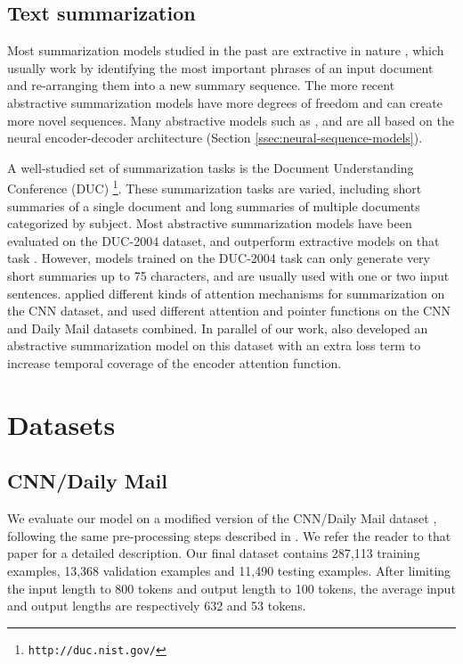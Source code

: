 \subsection{Text summarization}

Most summarization models studied in the past are extractive in nature \citep{dorr2003,nallapati2017,durrett2016learning}, which usually work by identifying the most important phrases of an input document and re-arranging them into a new summary sequence. The more recent abstractive summarization models have more degrees of freedom and can create more novel sequences. Many abstractive models such as \citet{rush2015}, \citet{chopra2016} and \citet{nallapati2016} are all based on the neural encoder-decoder architecture (Section \ref{ssec:neural-sequence-models}).

A well-studied set of summarization tasks is the Document Understanding Conference (DUC) \footnote{\tt http://duc.nist.gov/}. These summarization tasks are varied, including short summaries of a single document and long summaries of multiple documents categorized by subject. Most abstractive summarization models have been evaluated on the DUC-2004 dataset, and outperform extractive models on that task \citep{dorr2003}. However, models trained on the DUC-2004 task can only generate very short summaries up to 75 characters, and are usually used with one or two input sentences. \citet{chen2016distraction} applied different kinds of attention mechanisms for summarization on the CNN dataset, and \citet{nallapati2016} used different attention and pointer functions on the CNN and Daily Mail datasets combined. In parallel of our work, \citet{see2017} also developed an abstractive summarization model on this dataset with an extra loss term to increase temporal coverage of the encoder attention function.

\section{Datasets}
\label{sec:datasets}

\subsection{CNN/Daily Mail}

We evaluate our model on a modified version of the CNN/Daily Mail dataset \citep{hermann2015}, following the same pre-processing steps described in \citet{nallapati2016}. We refer the reader to that paper for a detailed description. Our final dataset contains 287,113 training examples, 13,368 validation examples and 11,490 testing examples. After limiting the input length to 800 tokens and output length to 100 tokens, the average input and output lengths are respectively 632 and 53 tokens.

